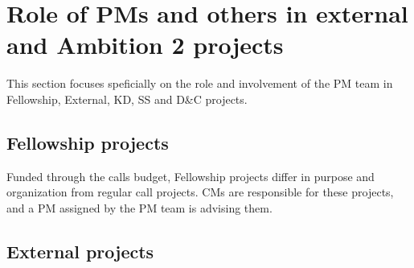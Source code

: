 \section{Role of PMs and others in external and Ambition 2 projects}
\label{app:pm-role}

This section focuses speficially on the role and involvement of the PM team in Fellowship,
External, KD, SS and D\&C projects.


\subsection{Fellowship projects}
Funded through the calls budget, Fellowship projects differ in purpose and organization from regular 
call projects. CMs are responsible for these projects, and a PM assigned by the PM team is advising them.

\subsection{External projects}

